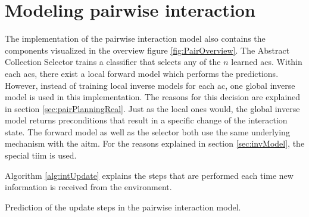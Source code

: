 \section{Modeling pairwise interaction \label{sec:pairRealization}}

The implementation of the pairwise interaction model also contains the components visualized in the overview figure \ref{fig:PairOverview}.
The Abstract Collection Selector trains a classifier that selects any of the $n$ learned \glspl{ac}. Within each \glspl{ac}, there exist a local forward model which performs the predictions.
However, instead of training local inverse models for each \gls{ac}, one global inverse model is used in this implementation. The reasons for this decision are explained in section \ref{sec:pairPlanningReal}.
Just as the local ones would, the global inverse model returns preconditions that result in a specific change of the interaction state.
The forward model as well as the selector both use the same underlying mechanism with the \acrfull{aitm}. For the reasons explained in section \ref{sec:invModel}, the special \acrfull{tiim} is used.

Algorithm \ref{alg:intUpdate} explains the steps that are performed each time new information is received from the environment.

\begin{algorithm}
	\BlankLine
	\caption{Prediction of the update steps in the pairwise interaction model.}
	\label{alg:intUpdate}
\end{algorithm}

